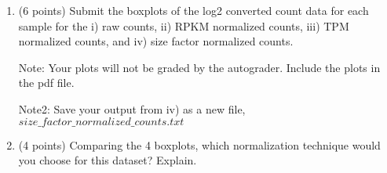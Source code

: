 \begin{enumerate}
\item (6 points) Submit the boxplots of the log2 converted count data for each sample for the i) raw counts, ii) RPKM normalized counts, iii) TPM normalized counts, and iv) size factor normalized counts. 

Note: Your plots will not be graded by the autograder. Include the plots in the pdf file. 

Note2: Save your output from iv) as a new file, $size\_factor\_normalized\_counts.txt$


\begin{solution}
\end{solution}


\item (4 points) Comparing the 4 boxplots, which normalization technique would you choose for this dataset? Explain.

\begin{solution}
\end{solution}



\end{enumerate}
